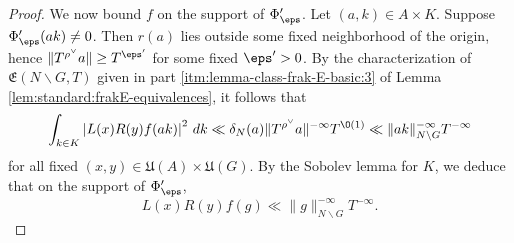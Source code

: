 \begin{proof}
  We now bound $f$ on the support of $\Phi_\eps '$.  Let $(a,k) \in A \times K$.  Suppose $\Phi_{\eps}'(a k) \neq 0$.  Then $r(a)$ lies outside some fixed neighborhood of the origin, hence $\|T^{\rho^\vee} a\| \geq T^{\eps '}$ for some fixed $\eps ' > 0$.  By the characterization of $\mathfrak{E}(N \backslash G, T)$ given in part \eqref{itm:lemma-class-frak-E-basic:3} of Lemma \ref{lem:standard:frakE-equivalences}, it follows that
  \begin{equation*}
    \int_{k \in K}
    \left\lvert
      L(x) R(y) f(a k)
    \right\rvert^2 \, d k
    \ll
    \delta_N(a)
    \|T^{\rho^\vee} a\|^{-\infty}
    T^{\O(1)}
    \ll \|a k\|_{N \backslash G}^{-\infty} T^{-\infty}
  \end{equation*}
  for all fixed $(x,y) \in \mathfrak{U}(A) \times \mathfrak{U}(G)$.  By the Sobolev lemma for $K$, we deduce that on the support of $\Phi_\eps'$,
  \begin{equation}\label{eq:lx-ry-fg}
    L(x) R(y) f(g) \ll \|g\|_{N \backslash G}^{-\infty} T^{-\infty}.
  \end{equation}


\end{proof}
